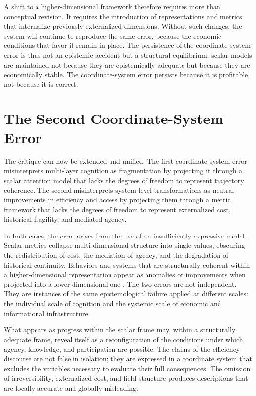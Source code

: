\documentclass[12pt, a4paper]{article}
\begin{document}
A shift to a higher-dimensional framework therefore requires more than conceptual revision. It requires the introduction of representations and metrics that internalize previously externalized dimensions. Without such changes, the system will continue to reproduce the same error, because the economic conditions that favor it remain in place. The persistence of the coordinate-system error is thus not an epistemic accident but a structural equilibrium: scalar models are maintained not because they are epistemically adequate but because they are economically stable. The coordinate-system error persists because it is profitable, not because it is correct.

\section{The Second Coordinate-System Error}

The critique can now be extended and unified. The first coordinate-system error misinterprets multi-layer cognition as fragmentation by projecting it through a scalar attention model that lacks the degrees of freedom to represent trajectory coherence. The second misinterprets system-level transformations as neutral improvements in efficiency and access by projecting them through a metric framework that lacks the degrees of freedom to represent externalized cost, historical fragility, and mediated agency.

In both cases, the error arises from the use of an insufficiently expressive model. Scalar metrics collapse multi-dimensional structure into single values, obscuring the redistribution of cost, the mediation of agency, and the degradation of historical continuity. Behaviors and systems that are structurally coherent within a higher-dimensional representation appear as anomalies or improvements when projected into a lower-dimensional one \cite{Barandes2023}. The two errors are not independent. They are instances of the same epistemological failure applied at different scales: the individual scale of cognition and the systemic scale of economic and informational infrastructure.

What appears as progress within the scalar frame may, within a structurally adequate frame, reveal itself as a reconfiguration of the conditions under which agency, knowledge, and participation are possible. The claims of the efficiency discourse are not false in isolation; they are expressed in a coordinate system that excludes the variables necessary to evaluate their full consequences. The omission of irreversibility, externalized cost, and field structure produces descriptions that are locally accurate and globally misleading.
\end{document}
